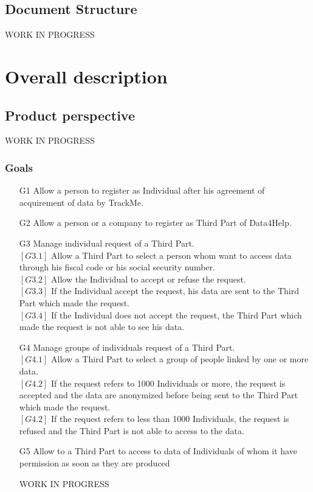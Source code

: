 \documentclass{report}
\begin{document}
		\section{Document Structure}
		WORK IN PROGRESS
	\chapter{Overall description}
		\section{Product perspective}
			WORK IN PROGRESS

			\subsection{Goals}
			\begin{itemize}
				\item[G1] Allow a person to register as Individual after his agreement of acquirement of data by TrackMe.
				
				\item[G2] Allow a person or a company to register as Third Part of Data4Help.

				\item[G3] Manage individual request of a Third Part.\\
				$\left[G3.1\right]$ Allow a Third Part to select a person whom want to access data through his fiscal code or his social security number.\\
				$\left[G3.2\right]$ Allow the Individual to accept or refuse the request.\\
				$\left[G3.3\right]$ If the Individual accept the request, his data are sent to the Third Part which made the request.\\
				$\left[G3.4\right]$ If the Individual does not accept the request, the Third Part which made the request is not able to see his data.
				
				\item[G4] Manage groups of individuals request of a Third Part.\\
				$\left[G4.1\right]$ Allow a Third Part to select a group of people linked by one or more data.\\
				$\left[G4.2\right]$ If the request refers to 1000 Individuals or more, the request is accepted and the data are anonymized before being sent to the Third Part which made the request.\\
				$\left[G4.2\right]$ If the request refers to less than 1000 Individuals, the request is refused and the Third Part is not able to access to the data.
				
				\item[G5] Allow to a Third Part to access to data of Individuals of whom it have permission as soon as they are produced
				
			WORK IN PROGRESS
			\end{itemize}
\end{document}
